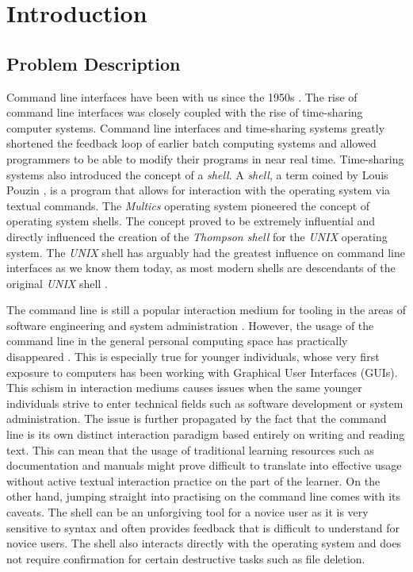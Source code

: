 \chapter{Introduction}
\label{chap:intro}

\section{Problem Description}

Command line interfaces have been with us since the 1950s
\cite{raymond2004art}. The rise of command line interfaces was closely coupled
with the rise of time-sharing computer systems. Command line interfaces and
time-sharing systems greatly shortened the feedback loop of earlier batch
computing systems and allowed programmers to be able to modify their programs
in near real time. Time-sharing systems also introduced the concept of a
\textit{shell}. A \textit{shell}, a term coined by Louis Pouzin \cite{pouzin},
is a program that allows for interaction with the operating system via textual
commands\cite{mashey1976using}. The \textit{Multics}\cite{corbato1965introduction} operating system
pioneered the concept of operating system shells. The concept proved to be
extremely influential and directly influenced the creation of the
\textit{Thompson shell} for the \textit{UNIX} \cite{ritchie1974unix} operating
system. The \textit{UNIX} shell has arguably had the greatest influence on
command line interfaces as we know them today, as most modern shells are
descendants of the original \textit{UNIX} shell \cite{raymond2004art}.

The command line is still a popular interaction medium for tooling in the areas
of software engineering and system administration
\cite{hultstrand2015git, takayama2006trust}. However, the usage of the command
line in the general personal computing space has practically disappeared
\cite{reimer2005history}. This is especially true for younger individuals,
whose very first exposure to computers has been working with Graphical User
Interfaces (GUIs). This schism in interaction mediums causes issues when the
same younger individuals strive to enter technical fields such as software
development or system administration. The issue is further propagated by the
fact that the command line is its own distinct interaction paradigm based
entirely on writing and reading text. This can mean that the usage of
traditional learning resources such as documentation and manuals might prove
difficult to translate into effective usage without active textual interaction
practice on the part of the learner. On the other hand, jumping straight into
practising on the command line comes with its caveats. The shell can be an
unforgiving tool for a novice user as it is very sensitive to syntax and often
provides feedback that is difficult to understand for novice users. The shell
also interacts directly with the operating system and does not require
confirmation for certain destructive tasks such as file deletion.

